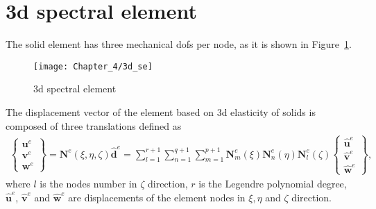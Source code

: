 \section{\Acl{3d} spectral element}
\label{sec:3Dmodel}

The solid element has three mechanical \acp{dof} per node, as it is shown in Figure~\ref{fig:3d_se}.
\begin{figure}
	\begin{center}
		\texttt{[image: Chapter\_4/3d\_se]}
	\end{center}
	\caption{\Acl{3d} spectral element}
	\label{fig:3d_se}
\end{figure}
The displacement vector of the element based on \ac{3d} elasticity of solids is composed of three translations defined as
\begin{eqnarray}
	\left \{ \begin{array}{c}
		\textbf{u}^e\\
		\textbf{v}^e\\
		\textbf{w}^e
	\end{array} \right\} = \textbf{N}^e(\xi,\eta, \zeta)\widehat{\textbf{d}}^e = \sum_{l=1}^{r+1}\sum_{n=1}^{q+1}\sum_{m=1}^{p+1}\textbf{N}_m^e(\xi)\textbf{N}_n^e(\eta)\textbf{N}_l^e(\zeta)
	\left \{ \begin{array}{c}
		\widehat{\textbf{u}}^e\\
		\widehat{\textbf{v}}^e\\
		\widehat{\textbf{w}}^e
	\end{array} \right\},
	\label{eq:3D_displ}
\end{eqnarray}
where \(l\) is the nodes number in \(\zeta\) direction, \(r\) is the Legendre polynomial degree, \(\widehat{\textbf{u}}^e\), \(\widehat{\textbf{v}}^e\) and 
\(\widehat{\textbf{w}}^e\) are displacements of the element nodes in \(\xi,\eta\) and \(\zeta\) direction.

